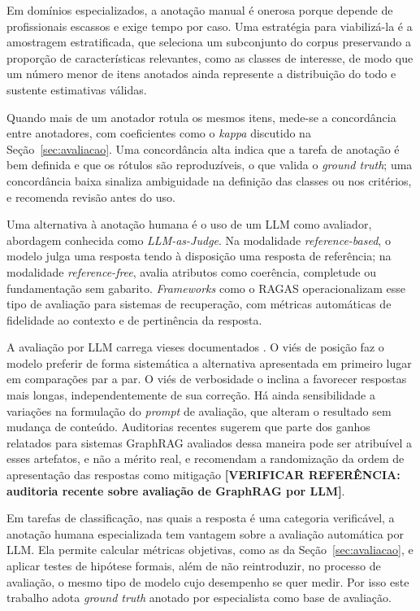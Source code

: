 Em domínios especializados, a anotação manual é onerosa porque depende de profissionais escassos e exige tempo por caso. Uma estratégia para viabilizá-la é a amostragem estratificada, que seleciona um subconjunto do corpus preservando a proporção de características relevantes, como as classes de interesse, de modo que um número menor de itens anotados ainda represente a distribuição do todo e sustente estimativas válidas.

Quando mais de um anotador rotula os mesmos itens, mede-se a concordância entre anotadores, com coeficientes como o \textit{kappa} discutido na Seção~\ref{sec:avaliacao}. Uma concordância alta indica que a tarefa de anotação é bem definida e que os rótulos são reproduzíveis, o que valida o \textit{ground truth}; uma concordância baixa sinaliza ambiguidade na definição das classes ou nos critérios, e recomenda revisão antes do uso.

Uma alternativa à anotação humana é o uso de um LLM como avaliador, abordagem conhecida como \textit{LLM-as-Judge}. Na modalidade \textit{reference-based}, o modelo julga uma resposta tendo à disposição uma resposta de referência; na modalidade \textit{reference-free}, avalia atributos como coerência, completude ou fundamentação sem gabarito. \textit{Frameworks} como o RAGAS \citep{es2023} operacionalizam esse tipo de avaliação para sistemas de recuperação, com métricas automáticas de fidelidade ao contexto e de pertinência da resposta.

A avaliação por LLM carrega vieses documentados \citep{zheng2023}. O viés de posição faz o modelo preferir de forma sistemática a alternativa apresentada em primeiro lugar em comparações par a par. O viés de verbosidade o inclina a favorecer respostas mais longas, independentemente de sua correção. Há ainda sensibilidade a variações na formulação do \textit{prompt} de avaliação, que alteram o resultado sem mudança de conteúdo. Auditorias recentes sugerem que parte dos ganhos relatados para sistemas GraphRAG avaliados dessa maneira pode ser atribuível a esses artefatos, e não a mérito real, e recomendam a randomização da ordem de apresentação das respostas como mitigação \textbf{[VERIFICAR REFERÊNCIA: auditoria recente sobre avaliação de GraphRAG por LLM]}.

Em tarefas de classificação, nas quais a resposta é uma categoria verificável, a anotação humana especializada tem vantagem sobre a avaliação automática por LLM. Ela permite calcular métricas objetivas, como as da Seção~\ref{sec:avaliacao}, e aplicar testes de hipótese formais, além de não reintroduzir, no processo de avaliação, o mesmo tipo de modelo cujo desempenho se quer medir. Por isso este trabalho adota \textit{ground truth} anotado por especialista como base de avaliação.

